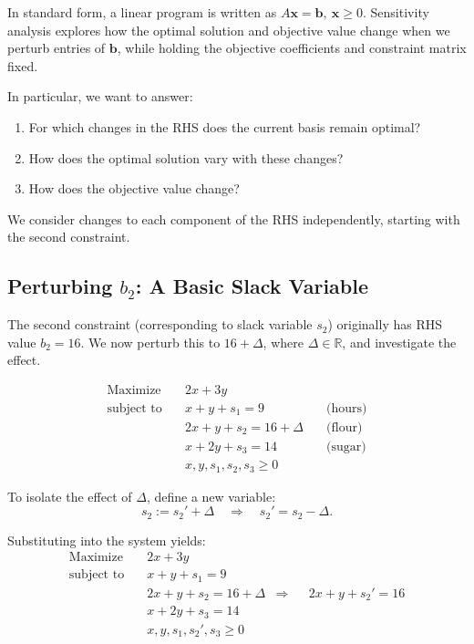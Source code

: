 In standard form, a linear program is written as \( A\mathbf{x} = \mathbf{b}, \ \mathbf{x} \geq 0 \). Sensitivity analysis explores how the optimal solution and objective value change when we perturb entries of \( \mathbf{b} \), while holding the objective coefficients and constraint matrix fixed.

\bigskip

In particular, we want to answer:
\begin{enumerate}
    \item For which changes in the RHS does the current basis remain optimal?
    \item How does the optimal solution vary with these changes?
    \item How does the objective value change?
\end{enumerate}

We consider changes to each component of the RHS independently, starting with the second constraint.

\subsection{Perturbing \( b_2 \): A Basic Slack Variable}

The second constraint (corresponding to slack variable \( s_2 \)) originally has RHS value \( b_2 = 16 \). We now perturb this to \( 16 + \Delta \), where \( \Delta \in \mathbb{R} \), and investigate the effect.

\begin{tcolorbox}[colback=gray!5!white, colframe=pink!75!black,    
    width=0.9\textwidth,
    box align=center, 
    title=\textbf{Perturbed Standard Form (RHS of Constraint 2)}]
\[
\begin{aligned}
\text{Maximize} \quad & 2x + 3y \\
\text{subject to} \quad 
& x + y + s_1 = 9 \quad & \text{(hours)} \\
& 2x + y + s_2 = 16 + \Delta \quad & \text{(flour)} \\
& x + 2y + s_3 = 14 \quad & \text{(sugar)} \\
& x, y, s_1, s_2, s_3 \geq 0
\end{aligned}
\]

To isolate the effect of \( \Delta \), define a new variable:
\[
s_2:= s_2' + \Delta \quad \Rightarrow \quad s_2' = s_2 - \Delta.
\]

Substituting into the system yields:
\[
\begin{aligned}
\text{Maximize} \quad & 2x + 3y \\
\text{subject to} \quad 
& x + y + s_1 = 9 \\
& 2x + y + s_2= 16 + \Delta  & \Rightarrow &&  2x + y + s_2'= 16\\
& x + 2y + s_3 = 14 \\
& x, y, s_1, s_2', s_3 \geq 0
\end{aligned}
\]
\end{tcolorbox}

